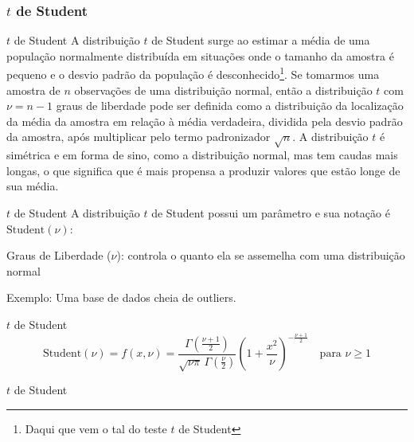 \subsubsection{$t$ de Student}
\begin{frame}{$t$ de Student}
	A distribuição $t$ de Student surge ao estimar a média de uma população
	normalmente distribuída em situações onde o tamanho da amostra é pequeno e o
	desvio padrão da população é
	desconhecido\footnote{Daqui que vem o tal do teste $t$ de Student}.
	\vfill
	Se tomarmos uma amostra de $n$ observações de uma distribuição normal,
	então a distribuição $t$ com $\nu = n-1$ graus de liberdade pode ser definida
	como a distribuição da localização da média da amostra em relação à média
	verdadeira, dividida pela desvio padrão da amostra, após multiplicar
	pelo termo padronizador $\sqrt{n}$.
	\vfill
	A distribuição $t$ é simétrica e em forma de sino, como a distribuição normal,
	mas tem caudas mais longas, o que significa que é mais propensa a produzir
	valores que estão longe de sua média.
\end{frame}

\begin{frame}{$t$ de Student}
	A distribuição $t$ de Student possui um parâmetro e sua notação é
	$\text{Student}(\nu)$:
	\begin{vfilleditems}
		\item Graus de Liberdade ($\nu$): controla o quanto ela se assemelha com uma distribuição normal
	\end{vfilleditems}
	\vfill
	Exemplo: Uma base de dados cheia de outliers.
\end{frame}

\begin{frame}{$t$ de Student}
	$$\text{Student}(\nu) = f(x, \nu) = \frac{\Gamma \left(\frac{\nu+1}{2} \right)} {\sqrt{\nu\pi}\,\Gamma \left(\frac{\nu}{2} \right)} \left(1+\frac{x^2}{\nu} \right)^{-\frac{\nu+1}{2}} \quad \text{para $\nu \geq 1$}$$
\end{frame}

\begin{frame}{$t$ de Student}
	\centering
\end{frame}

